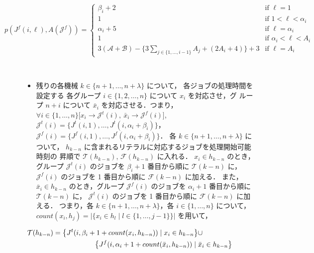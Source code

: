 \documentclass[12pt]{optlab-bachelor}
\begin{document}
\begin{displaymath}
  p(J^f(i,\ell),A(\mathcal{J}^f)) = \left\{ \begin{array}{lllll}
  \beta_i + 2 & \text{if } \ell = 1 \\
  1 & \text{if } 1 < \ell < \alpha_i \\ \alpha_i
  + 5 & \text{if } \ell = \alpha_i  \\ 1 & \text{if } \alpha_i < \ell < A_i \\ 3(\mathcal{A} + \mathcal{B}) -
  \big\{ 3\displaystyle \sum_{j \in \{1,\ldots,i - 1\}}A_j
  + (2A_i + 4)\big \} + 3 & \text{if }
  \ell = A_i \end{array} \right.
\end{displaymath}

\begin{description}
  \item[] ~
  \begin{itemize}
    \item 残りの各機械 $k \in \{n + 1, \ldots , n + \lambda\}$ について，
    各ジョブの処理時間を設定する
    各グループ $i \in \{1,2,\ldots,n\}$ について $x_i$ を対応させ，グ
    ループ $n + i$ について $\bar x_i$ を対応させる．つまり，$\forall
    i \in \{1,\ldots,n\}\big[x_i \to \mathcal{J}^t(i),\ \bar x_i \to
    \mathcal{J}^f(i) \big]$,
    $\mathcal{J}^t(i) = \big\{J^t(i,1),\ldots,J^t(i,\alpha_i +
    \beta_i)\big\}$，$\mathcal{J}^f(i) =
    \big\{J^f(i,1),\ldots,J^f(i,\alpha_i + \beta_i)\big\}$．
    各 $k \in \{n + 1, \ldots , n + \lambda\}$ について，
    $h_{k - n}$ に含まれるリテラルに対応するジョブを処理開始可能時刻の
    昇順で $\mathcal{T}(h_{k - n})$, $\mathcal{F}(h_{k - n})$ に入れる．
    $x_i \in h_{k - n}$ のとき，グループ $\mathcal{J}^t(i)$ のジョブを
    $\beta_i + 1$ 番目から順に $\mathcal{T}(k - n)$ に，
    $\mathcal{J}^f(i)$ のジョブを 1 番目から順に $\mathcal{F}(k - n)$ に加える．
    また，$\bar x_i \in h_{k - n}$ のとき，グループ $\mathcal{J}^f(i)$
    のジョブを $\alpha_i + 1$ 番目から順に $\mathcal{T}(k - n)$ に，
    $\mathcal{J}^t(i)$ のジョブを 1 番目から順に $\mathcal{F}(k - n)$ に加える．
    つまり，各 $k \in \{n + 1, \ldots,n + \lambda\}$，各 $i \in \{1,\ldots,n\}$
    について，$count(x_i,h_j) = \big|\big\{x_i \in h_l \mid l \in \{1,\ldots,j -
    1\}\big\}\big|$ を用いて，
  \end{itemize}
\end{description}
\begin{equation}
  \begin{split}
    \mathcal{T}(h_{k - n}) &= \big\{J^t(i,\beta_i + 1 +
    count(x_i,h_{k - n})) \mid x_i \in h_{k - n}\big\} \cup \\ &\qquad \qquad\qquad \big\{J^f(i,\alpha_i + 1 + count(\bar x_i, h_{k - n})) \mid \bar x_i \in h_{k - n}\big\} \notag
  \end{split}
\end{equation}
\end{document}
